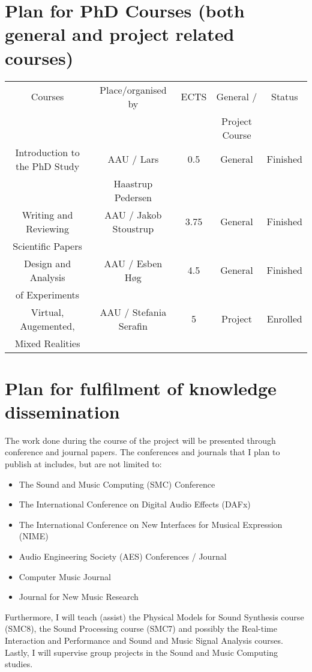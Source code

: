 \section{Plan for PhD Courses (both general and project related courses)}

\begin{tabular}{|c|c|c|c|c|}
\hline
   Courses  & Place/organised by & ECTS & General / & Status \\
   & & & Project Course & \\
   \hline
   
\rowcolor{lightestblue} Introduction to the PhD Study & AAU / Lars & 0.5 & General &  Finished \\
\rowcolor{lightestblue} & Haastrup Pedersen & & & \\
   Writing and Reviewing & AAU / Jakob Stoustrup & 3.75 & General & Finished \\
   Scientific Papers & & & & \\
\rowcolor{lightestblue} Design and Analysis& AAU / Esben H\o g & 4.5 & General & Finished\\
\rowcolor{lightestblue} of Experiments & & & & \\
   Virtual, Augemented, & AAU / Stefania Serafin & 5 & Project & Enrolled\\
    Mixed Realities & & & &\\
    \hline
\end{tabular}

\section{Plan for fulfilment of knowledge dissemination}
The work done during the course of the project will be presented through conference and journal papers. The conferences and journals that I plan to publish at includes, but are not limited to:
\begin{itemize}
\item The Sound and Music Computing (SMC) Conference
\item The International Conference on Digital Audio Effects (DAFx)
\item The International Conference on New Interfaces for Musical Expression (NIME)
\item Audio Engineering Society (AES) Conferences / Journal
\item Computer Music Journal
\item Journal for New Music Research
\end{itemize}
Furthermore, I will teach (assist) the Physical Models for Sound Synthesis course (SMC8), the Sound Processing course (SMC7) and possibly the Real-time Interaction and Performance and Sound and Music Signal Analysis courses. Lastly, I will supervise group projects in the Sound and Music Computing studies.

